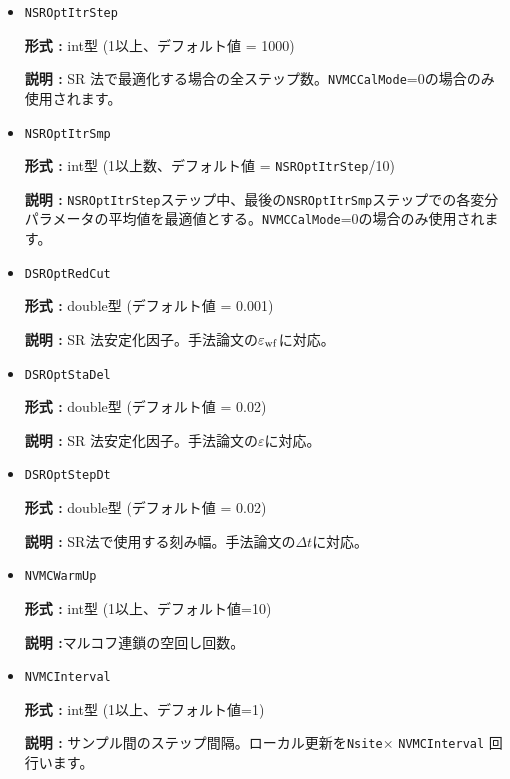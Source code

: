 \begin{itemize}
  {\bf 形式 :} int型 (1以上、{デフォルト値は副格子内部の並進ベクトルの数})

  {\bf 説明 :} 
  運動量・格子対称性の量子数射影の個数。
  TransSymファイルで指定した重みで上から\verb|NMPTrans|個まで使用する。{射影を行わない場合は1に設定する。}

 \item  \verb|NSROptItrStep|

{\bf 形式 :} int型 (1以上、デフォルト値 = 1000)

{\bf 説明 :} 
SR 法で最適化する場合の全ステップ数。\verb|NVMCCalMode|=0の場合のみ使用されます。
 
 \item  \verb|NSROptItrSmp|

{\bf 形式 :} int型 (1以上数、デフォルト値 = \verb|NSROptItrStep|/10)

{\bf 説明 :} \verb|NSROptItrStep|ステップ中、最後の\verb|NSROptItrSmp|ステップでの各変分パラメータの平均値を最適値とする。\verb|NVMCCalMode|=0の場合のみ使用されます。

\item   \verb|DSROptRedCut|
   
{\bf 形式 :} double型 (デフォルト値 = 0.001)

{\bf 説明 :} SR 法安定化因子。手法論文\cite{Tahara2008}の$\varepsilon_{\rm wf}$に対応。

 \item  \verb|DSROptStaDel| 
   
 {\bf 形式 :} double型 (デフォルト値 = 0.02)

  {\bf 説明 :} SR 法安定化因子。手法論文\cite{Tahara2008}の$\varepsilon$に対応。
     
\item \verb|DSROptStepDt|

{\bf 形式 :} double型 (デフォルト値 = 0.02)

{\bf 説明 :} {SR法で使用する刻み幅。手法論文\cite{Tahara2008}の$\Delta t$に対応。}
 
\item \verb|NVMCWarmUp|

{\bf 形式 :} int型 (1以上、デフォルト値=10)

{\bf 説明 :}マルコフ連鎖の空回し回数。

\item \verb|NVMCInterval|

{\bf 形式 :} int型 (1以上、デフォルト値=1)

{\bf 説明 :} サンプル間のステップ間隔。ローカル更新を\verb|Nsite|× \verb|NVMCInterval| 回行います。


\end{itemize}
